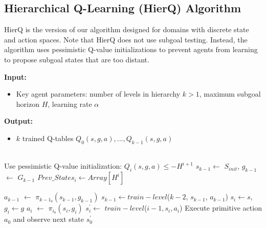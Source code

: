 \documentclass{article} %
\begin{document}
\newpage

\subsection{Hierarchical Q-Learning (HierQ) Algorithm}\label{HierQ}

HierQ is the version of our algorithm designed for domains with discrete state and action spaces.  Note that HierQ does not use subgoal testing.  Instead, the algorithm uses pessimistic Q-value initializations to prevent agents from learning to propose subgoal states that are too distant.

\begin{algorithm}
\caption{Hierarchical Q-Learning (HierQ)}\label{alg:HierQ}
\begin{algorithmic}

\State \textbf{Input:}
    \begin{itemize}
    \item Key agent parameters: number of levels in hierarchy $k > 1$, maximum subgoal horizon $H$, learning rate $\alpha$
    \end{itemize}
\State \textbf{Output:}
    \begin{itemize}
    \item $k$ trained Q-tables $Q_0(s,g,a), ... , Q_{k-1}(s,g,a)$
    \end{itemize}

\\


\State Use pessimistic Q-value initialization: $Q_i(s,g,a) \leq -H^{i+1}$
 
    \State $s_{k-1} \leftarrow$ $S_{init}$, $g_{k-1}$ $\leftarrow$ $G_{k-1}$ 
    \State {}
    \State $Prev\_States_i \gets Array[H^i]$ 
    
    \State
     
        \State $a_{k-1}$ $\gets$ $\pi_{k-1_b}(s_{k-1}, g_{k-1})$ 
        \State $s_{k-1} \gets train-level$($k-2$, $s_{k-1}$, $a_{k-1}$) 
    \EndWhile
\EndFor
\State
{}
\State $s_i \gets s$, $g_i \gets g$ 
    \State $a_i$ $\gets$ $\pi_{i_b}(s_i, g_i)$ 
        \State $s_{i}^{'} \gets$ $train-level$($i-1, s_i, a_i$) 
    \Else
        \State Execute primitive action $a_0$ and observe next state $s_{0}^{'}$
        

\end{algorithmic}
\end{algorithm}
\end{document}
